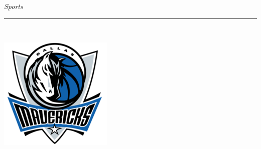 \documentclass[landscape]{article}
\renewcommand\headline[1]{\begin{center} {\huge \textsl{ #1}}\\ %
			\rule[5pt]{0.8\hsize}{0.5pt}\\ \end{center}}
\begin{document}
\begin{multicols}{3}
\headline{Sports}
\vspace{-0.3cm}

\begin{center}
	
\end{center}
\begin{minipage}{0.1\linewidth}
	\includegraphics[width=\linewidth]{images/mavs-logo.png}
\end{minipage}
\begin{minipage}{0.9\linewidth}
	
\end{minipage}
\begin{center}
	
\end{center}


\end{multicols}
\end{document}
